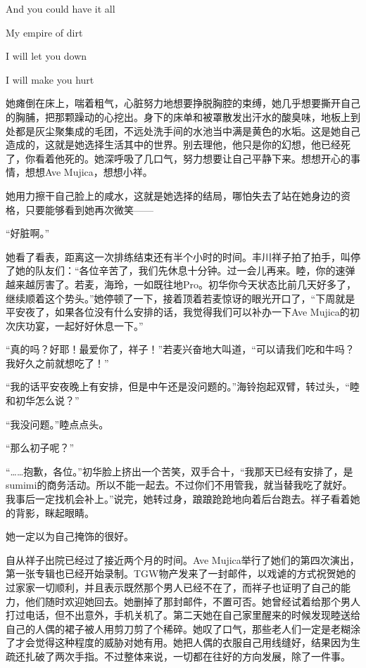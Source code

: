 \documentclass{article}
\begin{document}
And you could have it all

My empire of dirt

I will let you down

I will make you hurt



她瘫倒在床上，喘着粗气，心脏努力地想要挣脱胸腔的束缚，她几乎想要撕开自己的胸脯，把那颗躁动的心挖出。身下的床单和被罩散发出汗水的酸臭味，地板上到处都是灰尘聚集成的毛团，不远处洗手间的水池当中满是黄色的水垢。这是她自己造成的，这就是她选择生活其中的世界。别去理他，他只是你的幻想，他已经死了，你看着他死的。她深呼吸了几口气，努力想要让自己平静下来。想想开心的事情，想想Ave Mujica，想想小祥。



她用力擦干自己脸上的咸水，这就是她选择的结局，哪怕失去了站在她身边的资格，只要能够看到她再次微笑——



“好脏啊。”



\newpage



她看了看表，距离这一次排练结束还有半个小时的时间。丰川祥子拍了拍手，叫停了她的队友们：“各位辛苦了，我们先休息十分钟。过一会儿再来。睦，你的速弹越来越厉害了。若麦，海玲，一如既往地Pro。初华你今天状态比前几天好多了，继续顺着这个势头。”她停顿了一下，接着顶着若麦惊讶的眼光开口了，“下周就是平安夜了，如果各位没有什么安排的话，我觉得我们可以补办一下Ave Mujica的初次庆功宴，一起好好休息一下。”



“真的吗？好耶！最爱你了，祥子！”若麦兴奋地大叫道，“可以请我们吃和牛吗？我好久之前就想吃了！”



“我的话平安夜晚上有安排，但是中午还是没问题的。”海铃抱起双臂，转过头，“睦和初华怎么说？”



“我没问题。”睦点点头。



“那么初子呢？”



“……抱歉，各位。”初华脸上挤出一个苦笑，双手合十，“我那天已经有安排了，是sumimi的商务活动。所以不能一起去。不过你们不用管我，就当替我吃了就好。我事后一定找机会补上。”说完，她转过身，踉踉跄跄地向着后台跑去。祥子看着她的背影，眯起眼睛。



她一定以为自己掩饰的很好。



自从祥子出院已经过了接近两个月的时间。Ave Mujica举行了她们的第四次演出，第一张专辑也已经开始录制。TGW物产发来了一封邮件，以戏谑的方式祝贺她的过家家一切顺利，并且表示既然那个男人已经不在了，而祥子也证明了自己的能力，他们随时欢迎她回去。她删掉了那封邮件，不置可否。她曾经试着给那个男人打过电话，但不出意外，手机关机了。第二天她在自己家里醒来的时候发现睦送给自己的人偶的裙子被人用剪刀剪了个稀碎。她叹了口气，那些老人们一定是老糊涂了才会觉得这种程度的威胁对她有用。她把人偶的衣服自己用线缝好，结果因为生疏还扎破了两次手指。不过整体来说，一切都在往好的方向发展，除了一件事。
\end{document}

